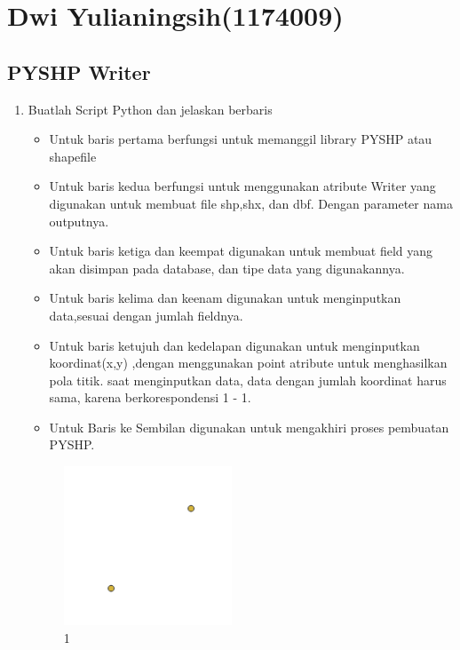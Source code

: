 \section{Dwi Yulianingsih(1174009)}
\subsection{PYSHP Writer}
\begin{enumerate}
	\item Buatlah Script Python dan jelaskan berbaris
	
	\begin{itemize}
		\item Untuk baris pertama berfungsi untuk memanggil library PYSHP atau shapefile
		\item Untuk baris kedua berfungsi untuk menggunakan atribute Writer yang digunakan untuk membuat file shp,shx, dan dbf. Dengan parameter nama outputnya.
		\item Untuk baris ketiga dan keempat digunakan untuk membuat field yang akan disimpan pada database, dan tipe data yang digunakannya.
		\item Untuk baris kelima dan keenam digunakan untuk menginputkan data,sesuai dengan jumlah fieldnya.
		\item Untuk baris ketujuh dan kedelapan digunakan untuk menginputkan koordinat(x,y) ,dengan menggunakan point atribute untuk menghasilkan pola titik. \hfill\break
		saat menginputkan data, data dengan jumlah koordinat harus sama, karena berkorespondensi 1 - 1.
		\item Untuk Baris ke Sembilan digunakan untuk mengakhiri proses pembuatan PYSHP.
	\end{itemize}
	\hfill\break
	\begin{figure}[H]
		\includegraphics[width=5cm]{figures/1174009/2/1.png}
		\centering
		\caption{ 1 }
	\end{figure}


\end{enumerate}
